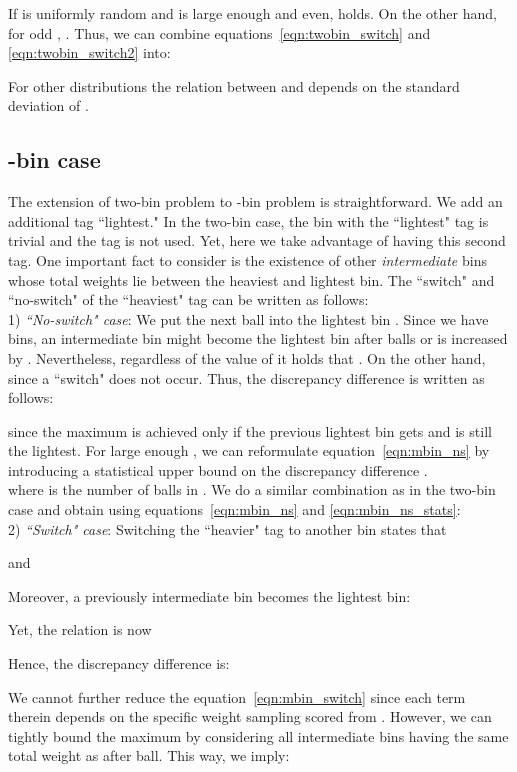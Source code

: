 \documentclass[12pt,psfig,a4]{article}
\theoremstyle{plain}
\begin{document}
If  is uniformly random and  is large enough and even,  holds. On the other hand, for odd , . Thus, we can combine equations~\ref{eqn:twobin_switch} and \ref{eqn:twobin_switch2} into:


For other distributions the relation between  and  depends on the standard deviation of . 

\subsection{-bin case}
The extension of two-bin problem to -bin problem is straightforward. We add an additional tag ``lightest." In the two-bin case, the bin with the ``lightest" tag is trivial and the tag is not used. Yet, here we take advantage of having this second tag. One important fact to consider is the existence of other \textit{intermediate} bins whose total weights lie between the heaviest and lightest bin. The ``switch" and ``no-switch" of the ``heaviest" tag can be written as follows:\\
1) \textit{``No-switch" case}: We put the next ball  into the lightest bin . Since we have  bins, an intermediate bin might become the lightest bin after  balls or  is increased by . Nevertheless, regardless of the value of  it holds that . On the other hand,  since a ``switch" does not occur. Thus, the discrepancy difference is written as follows:


since the maximum  is achieved only if the previous lightest bin gets  and is still the lightest. 
For large enough , we can reformulate equation~\ref{eqn:mbin_ns} by introducing a statistical upper bound on the discrepancy difference . \\


where  is the number of balls in . We do a similar combination as in the two-bin case and obtain using equations~\ref{eqn:mbin_ns} and \ref{eqn:mbin_ns_stats}: \\

2) \textit{``Switch" case}: Switching the ``heavier" tag to another bin states that 


and 

Moreover, a previously intermediate bin becomes the lightest bin:  
 

Yet, the relation is now
 

Hence, the discrepancy difference is: 


We cannot further reduce the equation~\ref{eqn:mbin_switch} since each term therein depends on the specific weight sampling scored from . However, we can tightly bound the maximum  by considering all intermediate bins having the same total weight as  after  ball. This way, we imply:
 
\end{document}
